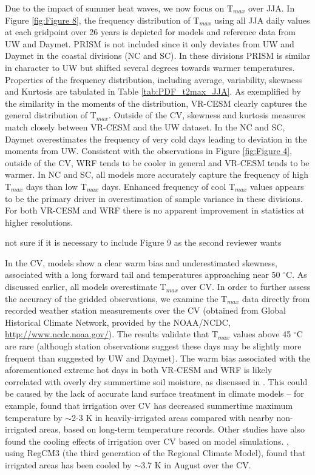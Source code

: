 \documentclass[draft,ms]{agutex}   %
\begin{document}
\begin{article}
Due to the impact of summer heat waves, we now focus on T$_{max}$ over JJA. In Figure \ref{fig:Figure 8}, the frequency distribution of T$_{max}$ using all JJA daily values at each gridpoint over 26 years is depicted for models and reference data from UW and Daymet. PRISM is not included since it only deviates from UW and Daymet in the coastal divisions (NC and SC).  In these divisions PRISM is similar in character to UW but shifted several degrees towards warmer temperatures. Properties of the frequency distribution, including average, variability, skewness and Kurtosis are tabulated in Table \ref{tab:PDF_t2max_JJA}.  As exemplified by the similarity in the moments of the distribution, VR-CESM clearly captures the general distribution of T$_{max}$. Outside of the CV, skewness and kurtosis measures match closely between VR-CESM and the UW dataset. In the NC and SC, Daymet overestimates the frequency of very cold days leading to deviation in the moments from UW.  Consistent with the observations in Figure \ref{fig:Figure 4}, outside of the CV, WRF tends to be cooler in general and VR-CESM tends to be warmer.  In NC and SC, all models more accurately capture the frequency of high T$_{max}$ days than low T$_{max}$ days. Enhanced frequency of cool T$_{max}$ values appears to be the primary driver in overestimation of sample variance in these divisions. For both VR-CESM and WRF there is no apparent improvement in statistics at higher resolutions.

{\color{red}not sure if it is necessary to include Figure 9 as the second reviewer wants}

In the CV, models show a clear warm bias and underestimated skewness, associated with a long forward tail and temperatures approaching near 50 $^\circ$C. As discussed earlier, all models overestimate T$_{max}$ over CV. In order to further assess the accuracy of the gridded observations, we examine the T$_{max}$ data directly from recorded weather station measurements over the CV (obtained from Global Historical Climate Network, provided by the NOAA/NCDC, \url{http://www.ncdc.noaa.gov/}). The results validate that T$_{max}$ values above 45 $^\circ$C are rare (although station observations suggest these days may be slightly more frequent than suggested by UW and Daymet). The warm bias associated with the aforementioned extreme hot days in both VR-CESM and WRF is likely correlated with overly dry summertime soil moisture, as discussed in \cite{caldwell2009evaluation}. This could be caused by the lack of accurate land surface treatment in climate models -- for example, \cite{bonfils2007empirical} found that irrigation over CV has decreased summertime maximum temperature by $\sim$2-3 K in heavily-irrigated areas compared with nearby non-irrigated areas, based on long-term temperature records. Other studies have also found the cooling effects of irrigation over CV based on model simulations. \cite{kueppers2007irrigation}, using RegCM3 (the third generation of the Regional Climate Model), found that irrigated areas has been cooled by $\sim$3.7 K in August over the CV.



\end{article}
\end{document}
